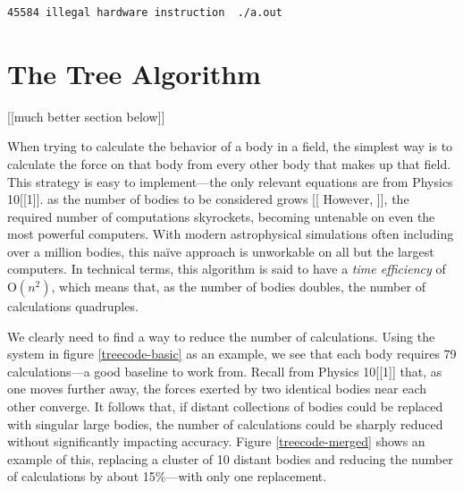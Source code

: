 \documentclass[12pt,twoside]{reedthesis}
\begin{document}
\begin{lstlisting}[caption={An error thrown by an unsupported instruction on OS X\label{SIGILL}}]
	45584 illegal hardware instruction  ./a.out
\end{lstlisting}

\section{The Tree Algorithm}

[[much better section below]]

When trying to calculate the behavior of a body in a field, the simplest way is to calculate the force on that body from every other body that makes up that field. This strategy is easy to implement---the only relevant equations are from Physics 10[[1]]. as the number of bodies to be considered grows [[ However, ]], the required number of computations skyrockets, becoming untenable on even the most powerful computers. With modern astrophysical simulations often including over a million bodies, this na\"ive approach is unworkable on all but the largest computers. In technical terms, this algorithm is said to have a \emph{time efficiency} of O$(n^2)$, which means that, as the number of bodies doubles, the number of calculations quadruples.

We clearly need to find a way to reduce the number of calculations. Using the system in figure \ref{treecode-basic} as an example, we see that each body requires 79 calculations---a good baseline to work from. Recall from Physics 10[[1]] that, as one moves further away, the forces exerted by two identical bodies near each other converge. It follows that, if distant collections of bodies could be replaced with singular large bodies, the number of calculations could be sharply reduced without significantly impacting accuracy. Figure \ref{treecode-merged} shows an example of this, replacing a cluster of 10 distant bodies and reducing the number of calculations by about 15\%---with only one replacement.
\end{document}
